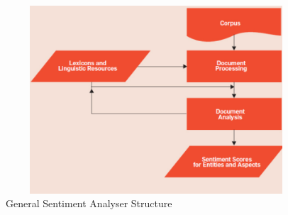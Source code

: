 \begin{figure}[h!]
    \centering
    \includegraphics[width=15cm,height=7cm,keepaspectratio]{background/sentStructure.png}
    \caption{General Sentiment Analyser Structure\cite{feldman2013techniques}}
    \label{fig:sentStructure}
\end{figure}

